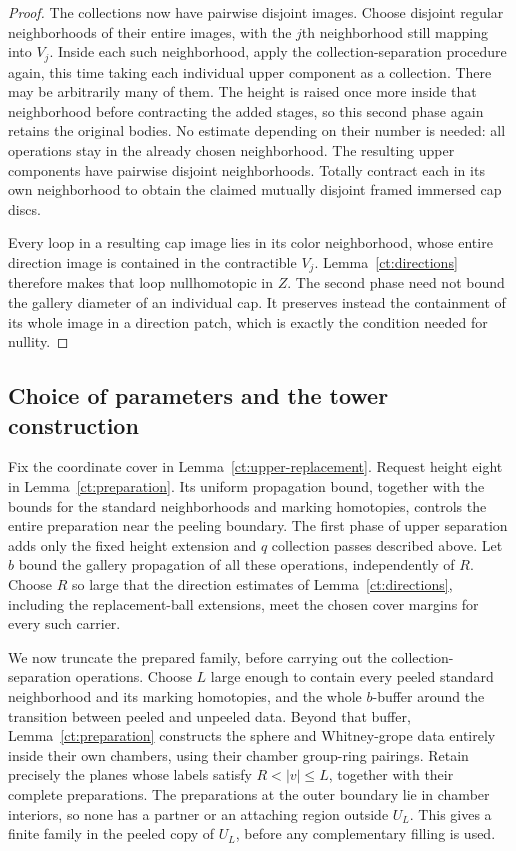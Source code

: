 \begin{proof}
The collections now have pairwise disjoint images. Choose disjoint
regular neighborhoods of their entire images, with the $j$th
neighborhood still mapping into $V_j$. Inside each such neighborhood,
apply the collection-separation procedure again, this time taking
each individual upper component as a collection. There may be
arbitrarily many of them. The height is raised once more inside that
neighborhood before contracting the added stages, so this second
phase again retains the original bodies. No estimate depending on
their number is needed: all operations stay in the already chosen
neighborhood. The resulting upper components have pairwise disjoint
neighborhoods. Totally contract each in its own neighborhood to obtain
the claimed mutually disjoint framed immersed cap discs.

Every loop in a resulting cap image lies in its color neighborhood,
whose entire direction image is contained in the contractible $V_j$.
Lemma~\ref{ct:directions} therefore makes that loop nullhomotopic in
$Z$. The second phase need not bound the gallery diameter of an
individual cap. It preserves instead the containment of its whole
image in a direction patch, which is exactly the condition needed
for nullity.
\end{proof}

\subsection{Choice of parameters and the tower construction}

Fix the coordinate cover in Lemma~\ref{ct:upper-replacement}. Request
height eight in Lemma~\ref{ct:preparation}. Its uniform propagation
bound, together with the bounds for the standard neighborhoods and
marking homotopies, controls the entire preparation near the peeling
boundary. The first phase of upper separation adds only the fixed
height extension and $q$ collection passes described above. Let $b$
bound the gallery propagation of all these operations, independently
of $R$. Choose $R$ so large that the direction estimates of
Lemma~\ref{ct:directions}, including the replacement-ball extensions,
meet the chosen cover margins for every such carrier.

We now truncate the prepared family, before carrying out the
collection-separation operations. Choose $L$ large enough to contain
every peeled standard neighborhood and its marking homotopies, and
the whole $b$-buffer around the transition between peeled and
unpeeled data. Beyond that buffer, Lemma~\ref{ct:preparation} constructs
the sphere and Whitney-grope data entirely inside their own chambers,
using their chamber group-ring pairings. Retain precisely the planes
whose labels satisfy $R<|v|\le L$, together with their complete
preparations. The preparations at the outer boundary lie in chamber
interiors, so none has a partner or an attaching region outside
$U_L$. This gives a finite family in the peeled copy of $U_L$, before
any complementary filling is used.

